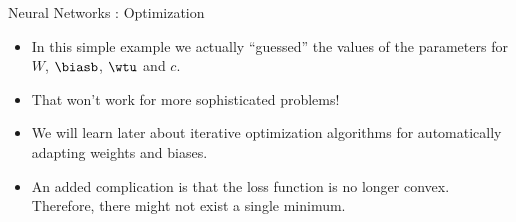\begin{frame} {Neural Networks : Optimization}
  \begin{itemize}
    \item In this simple example we actually \enquote{guessed} the values of the parameters for $W$, $\biasb$, $\wtu$ and $c$.
    \vspace{3mm}
    \item That won't work for more sophisticated problems!
    \vspace{3mm}
    \item We will learn later about iterative optimization algorithms for automatically adapting weights and biases.
    \vspace{3mm}
    \item An added complication is that the loss function is no longer convex. Therefore, there might not exist a single minimum. 
  \end{itemize}
\end{frame}

\endlecture
